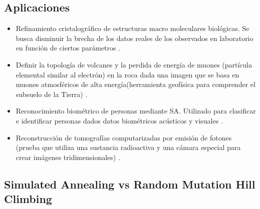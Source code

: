 \documentclass[12pt,twoside]{article}
\begin{document}
	\subsection{Aplicaciones}
	
	\begin{itemize}
		\item Refinamiento cristalográfico de estructuras macro moleculares biológicas. Se busca disminuir la brecha de los datos reales de los observados en laboratorio en función de ciertos parámetros \cite{cristal}.
		
		\item Definir la topología de volcanes y la perdida de energía de muones (partícula elemental similar al electrón) en la roca dada una imagen que se basa en muones atmosféricos de alta energía(herramienta geofísica para comprender el subsuelo de la Tierra) \cite{volcan}.
		
		\item Reconocimiento biométrico de personas mediante SA. Utilizado para clasificar e identificar personas dados datos biométricos acústicos y visuales \cite{reconocimiento}. 
		
		\item Reconstrucción de tomografías computarizadas por emisión de fotones (prueba que utiliza una sustancia radioactiva y una cámara especial para crear imágenes tridimensionales) \cite{spect}. 
	\end{itemize}
	
\subsection[SA vs RMHC]{Simulated Annealing vs Random Mutation Hill Climbing}		
\end{document}
